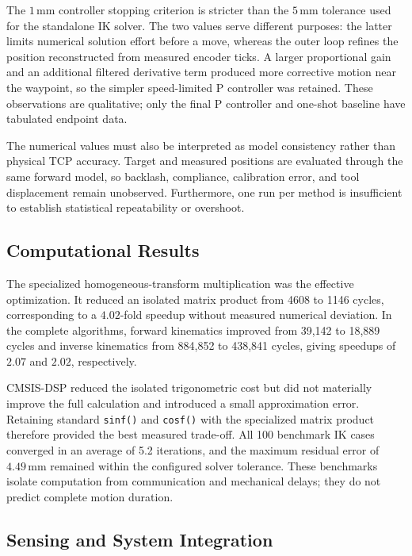 The \(1\,\mathrm{mm}\) controller stopping criterion is stricter than the
\(5\,\mathrm{mm}\) tolerance used for the standalone IK solver. The two values
serve different purposes: the latter limits numerical solution effort before a
move, whereas the outer loop refines the position reconstructed from measured
encoder ticks. A larger proportional gain and an additional filtered derivative
term produced more corrective motion near the waypoint, so the simpler
speed-limited P controller was retained. These observations are qualitative;
only the final P controller and one-shot baseline have tabulated endpoint data.

The numerical values must also be interpreted as model consistency rather than
physical TCP accuracy. Target and measured positions are evaluated through the
same forward model, so backlash, compliance, calibration error, and tool
displacement remain unobserved. Furthermore, one run per method is insufficient
to establish statistical repeatability or overshoot.

\subsection{Computational Results}

The specialized homogeneous-transform multiplication was the effective
optimization. It reduced an isolated matrix product from 4608 to 1146 cycles,
corresponding to a \(4.02\)-fold speedup without measured numerical deviation.
In the complete algorithms, forward kinematics improved from 39,142 to 18,889
cycles and inverse kinematics from 884,852 to 438,841 cycles, giving speedups of
\(2.07\) and \(2.02\), respectively.

CMSIS-DSP reduced the isolated trigonometric cost but did not materially improve
the full calculation and introduced a small approximation error. Retaining
standard \texttt{sinf()} and \texttt{cosf()} with the specialized matrix product
therefore provided the best measured trade-off. All 100 benchmark IK cases
converged in an average of 5.2 iterations, and the maximum residual error of
\(4.49\,\mathrm{mm}\) remained within the configured solver tolerance. These
benchmarks isolate computation from communication and mechanical delays; they
do not predict complete motion duration.

\subsection{Sensing and System Integration}

